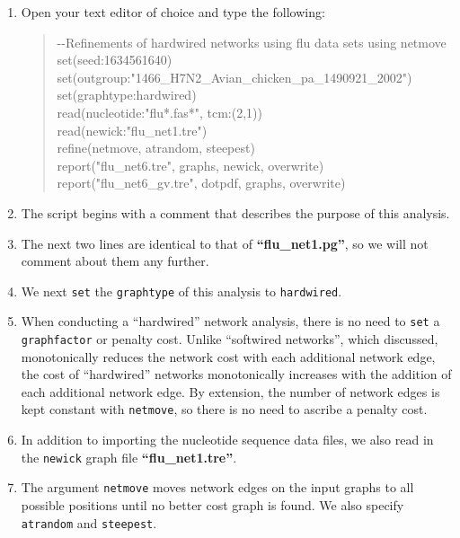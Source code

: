 \documentclass[11pt]{article}
\begin{document}
\begin {enumerate}

\item Open your text editor of choice and type the following:

	\begin{quote}	
	-\/-Refinements of hardwired networks using flu data sets using netmove\\
	set(seed:1634561640)\\
	set(outgroup:"1466\_H7N2\_Avian\_chicken\_pa\_1490921\_2002")\\
	set(graphtype:hardwired)\\
	read(nucleotide:"flu*.fas*", tcm:(2,1))\\
	read(newick:"flu\_net1.tre")\\
	refine(netmove, atrandom, steepest)\\
	report("flu\_net6.tre", graphs, newick, overwrite)\\
	report("flu\_net6\_gv.tre", dotpdf, graphs, overwrite)
	\end{quote}
	
\item The script begins with a comment that describes the purpose of this 
analysis.

\item The next two lines are identical to that of \textbf{``flu\_net1.pg''}, so we 
will not comment about them any further. 	

\item We next \texttt{set} the \texttt{graphtype} of this analysis to \texttt{hardwired}. 

\item When conducting a ``hardwired'' network analysis, there is no need to \texttt{set}
a \texttt{graphfactor} or penalty cost. Unlike ``softwired networks'', which discussed, 
monotonically reduces the network cost with each additional network edge, 
the cost of ``hardwired'' networks monotonically increases with the addition of each 
additional network edge. By extension, the number of network edges is kept constant
with \texttt{netmove}, so there is no need to ascribe a penalty cost.

\item In addition to importing the nucleotide sequence data files, we also read in 
the \texttt{newick} graph file \textbf{``flu\_net1.tre''}.

\item The argument \texttt{netmove} moves network edges on the input graphs 
to all possible positions until no better cost graph is found. We also specify 
\texttt{atrandom} and \texttt{steepest}.


\end{enumerate}
\end{document}
